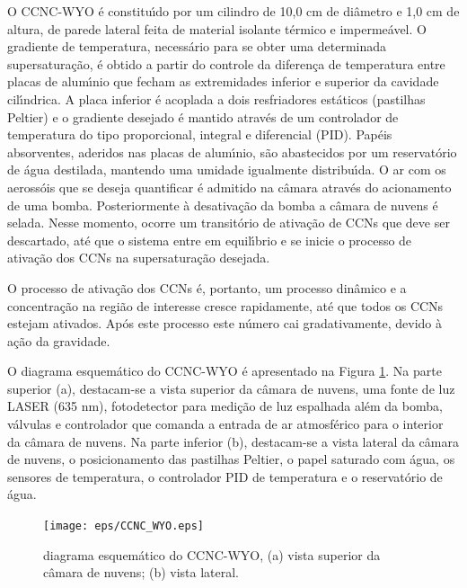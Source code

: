 O CCNC-WYO \'{e} constitu\'{\i}do por um cilindro de 10,0 cm de di\^{a}metro e 1,0 cm de altura, de parede lateral feita de material isolante t\'{e}rmico e imperme\'{a}vel. O gradiente de temperatura, necess\'{a}rio para se obter uma determinada supersatura\c{c}\~{a}o, \'{e} obtido a partir do controle da diferen\c{c}a de temperatura entre placas de alum\'{\i}nio que fecham as extremidades inferior e superior da cavidade cil\'{\i}ndrica. A placa inferior \'{e} acoplada a dois resfriadores est\'{a}ticos (pastilhas Peltier) e o gradiente desejado \'{e} mantido atrav\'{e}s de um controlador de temperatura do tipo proporcional, integral e diferencial (PID). Pap\'{e}is absorventes, aderidos nas placas de alum\'{\i}nio, s\~{a}o abastecidos por um reservat\'{o}rio de \'{a}gua destilada, mantendo uma umidade igualmente distribu\'{\i}da. O ar com os aeross\'{o}is que se deseja quantificar \'{e} admitido na c\^{a}mara atrav\'{e}s do acionamento de uma bomba. Posteriormente \`{a} desativa\c{c}\~{a}o da bomba a c\^{a}mara de nuvens \'{e} selada. Nesse momento, ocorre um transit\'{o}rio de ativa\c{c}\~{a}o de CCNs que deve ser descartado, at\'{e} que o sistema entre em equil\'{\i}brio e se inicie o processo de ativa\c{c}\~{a}o dos CCNs na supersatura\c{c}\~{a}o desejada.

O processo de ativa\c{c}\~{a}o dos CCNs \'{e}, portanto, um processo din\^{a}mico e a concentra\c{c}\~{a}o na regi\~{a}o de interesse cresce rapidamente, at\'{e} que todos os CCNs estejam ativados. Ap\'{o}s este processo este n\'{u}mero cai gradativamente, devido \`{a} a\c{c}\~{a}o da gravidade.

O diagrama esquem\'{a}tico do CCNC-WYO \'{e} apresentado na Figura \ref{CCNCSDCC}. Na parte superior (a), destacam-se a vista superior da c\^{a}mara de nuvens, uma fonte de luz LASER (635 nm), fotodetector para medi\c{c}\~{a}o de luz espalhada al\'{e}m da bomba, v\'{a}lvulas e controlador que comanda a entrada de ar atmosf\'{e}rico para o interior da c\^{a}mara de nuvens. Na parte inferior (b), destacam-se a vista lateral da c\^{a}mara de nuvens, o posicionamento das pastilhas Peltier, o papel saturado com \'{a}gua, os sensores de temperatura, o controlador PID de temperatura e o reservat\'{o}rio de \'{a}gua.



\begin{figure}[htb]
\begin{center}
\texttt{[image: eps/CCNC\_WYO.eps]}\\
\end{center}
\caption{\label{CCNCSDCC}\hspace{-0.1em} diagrama esquem\'{a}tico do CCNC-WYO,  (a)  vista superior da c\^{a}mara de nuvens; (b) vista lateral.}
\end{figure}



